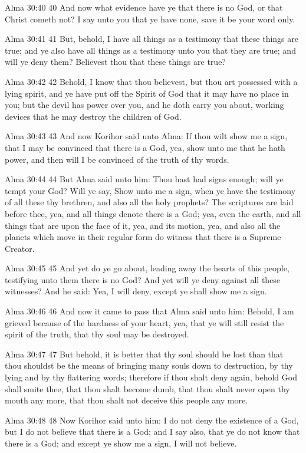 Alma 30:40
 40 And now what evidence have ye that there is no God, or that
Christ cometh not? I say unto you that ye have none, save it be
your word only.

Alma 30:41
 41 But, behold, I have all things as a testimony that these
things are true; and ye also have all things as a testimony unto
you that they are true; and will ye deny them? Believest thou
that these things are true?

Alma 30:42
 42 Behold, I know that thou believest, but thou art possessed
with a lying spirit, and ye have put off the Spirit of God that
it may have no place in you; but the devil has power over you,
and he doth carry you about, working devices that he may destroy
the children of God.

Alma 30:43
 43 And now Korihor said unto Alma: If thou wilt show me a sign,
that I may be convinced that there is a God, yea, show unto me
that he hath power, and then will I be convinced of the truth of
thy words.

Alma 30:44
 44 But Alma said unto him: Thou hast had signs enough; will ye
tempt your God? Will ye say, Show unto me a sign, when ye have
the testimony of all these thy brethren, and also all the holy
prophets? The scriptures are laid before thee, yea, and all
things denote there is a God; yea, even the earth, and all things
that are upon the face of it, yea, and its motion, yea, and also
all the planets which move in their regular form do witness that
there is a Supreme Creator.

Alma 30:45
 45 And yet do ye go about, leading away the hearts of this
people, testifying unto them there is no God? And yet will ye
deny against all these witnesses? And he said: Yea, I will deny,
except ye shall show me a sign.

Alma 30:46
 46 And now it came to pass that Alma said unto him: Behold, I am
grieved because of the hardness of your heart, yea, that ye will
still resist the spirit of the truth, that thy soul may be
destroyed.

Alma 30:47
 47 But behold, it is better that thy soul should be lost than
that thou shouldst be the means of bringing many souls down to
destruction, by thy lying and by thy flattering words; therefore
if thou shalt deny again, behold God shall smite thee, that thou
shalt become dumb, that thou shalt never open thy mouth any more,
that thou shalt not deceive this people any more.

Alma 30:48
 48 Now Korihor said unto him: I do not deny the existence of a
God, but I do not believe that there is a God; and I say also,
that ye do not know that there is a God; and except ye show me a
sign, I will not believe.

